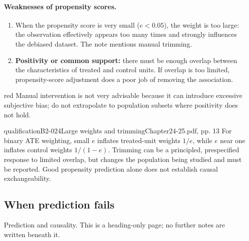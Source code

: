 \paragraph{Weaknesses of propensity scores.}
\begin{enumerate}
\item When the propensity score is very small (\(e<0.05\)), the weight is too large: the observation effectively appears too many times and strongly influences the debiased dataset. The note mentions manual trimming. 
\item \textbf{Positivity or common support:} there must be enough overlap between the characteristics of treated and control units. If overlap is too limited, propensity-score adjustment does a poor job of removing the association.
\end{enumerate}
\begin{inkblock}{red}
Manual intervention is not very advisable because it can introduce excessive subjective bias; do not extrapolate to population subsets where positivity does not hold.
\end{inkblock}\begin{reviewnote}{qualification}{B2-024}{Large weights and trimming}{Chapter24-25.pdf, pp. 13}
For binary ATE weighting, small \(e\) inflates treated-unit weights \(1/e\), while \(e\) near one inflates control weights \(1/(1-e)\). Trimming can be a principled, prespecified response to limited overlap, but changes the population being studied and must be reported. Good propensity prediction alone does not establish causal exchangeability.
\par{}
\end{reviewnote}


\subsection{When prediction fails}
Prediction and causality. This is a heading-only page; no further notes are written beneath it.
